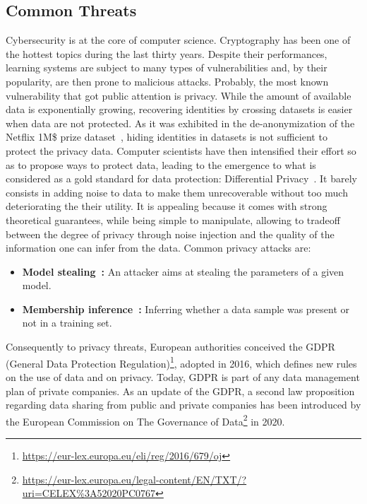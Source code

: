 \subsection{Common Threats}
Cybersecurity is at the core of computer science. Cryptography has been one of the hottest topics during the last thirty years. Despite their performances, learning systems are subject to many types of vulnerabilities and, by their popularity, are then prone to malicious attacks. Probably, the most known vulnerability that got public attention is privacy. While the amount of available data is exponentially growing, recovering identities by crossing datasets is easier when data are not protected. As it was exhibited in the de-anonymization of the Netflix 1M\$ prize dataset~\citep{narayanan2008robust}, hiding identities in datasets is not sufficient to protect the privacy data. Computer scientists have then intensified their effort so as to propose ways to protect data, leading to the emergence to what is considered as a gold standard for data protection: Differential Privacy~\citep{dwork2008differential}. It barely consists in adding noise to data to make them unrecoverable without too much deteriorating the their utility. It is appealing because it comes with strong theoretical guarantees, while being simple to manipulate,  allowing to tradeoff between the degree of privacy through noise injection and the quality of the information one can infer from the data.  Common privacy attacks are:
\begin{itemize}

    \item  \textbf{Model stealing~\citep{tramer2016stealing}:} An attacker aims at stealing the parameters of a given model.
    \item \textbf{Membership inference~\citep{shokri2017membership}:} Inferring whether a data sample was present or not in a training set. 

\end{itemize}
    

Consequently to privacy threats, European authorities conceived the GDPR (General Data Protection Regulation)\footnote{\url{https://eur-lex.europa.eu/eli/reg/2016/679/oj}}, adopted in 2016, which defines new rules on the use of data and on privacy. Today, GDPR is part of any data management plan of private companies. 
As an update of the GDPR, a second law proposition regarding data sharing from public and private companies has been introduced by the European Commission on The Governance of Data\footnote{\url{https://eur-lex.europa.eu/legal-content/EN/TXT/?uri=CELEX\%3A52020PC0767}} in 2020.

